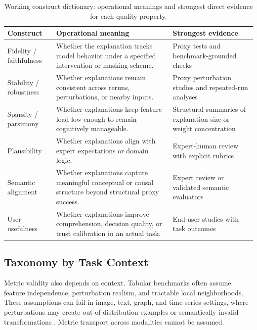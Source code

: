 \documentclass[twoside,11pt]{article}
\begin{document}
\begin{table}[t]
\centering
\caption{Working construct dictionary: operational meanings and strongest
direct evidence for each quality property.}
\begin{tabularx}{\linewidth}{l X X}
\toprule
\textbf{Construct} & \textbf{Operational meaning} & \textbf{Strongest evidence} \\
\midrule
Fidelity / faithfulness & Whether the explanation tracks model behavior under a specified intervention or masking scheme. & Proxy tests and benchmark-grounded checks \\
Stability / robustness & Whether explanations remain consistent across reruns, perturbations, or nearby inputs. & Proxy perturbation studies and repeated-run analyses \\
Sparsity / parsimony & Whether explanations keep feature load low enough to remain cognitively manageable. & Structural summaries of explanation size or weight concentration \\
Plausibility & Whether explanations align with expert expectations or domain logic. & Expert-human review with explicit rubrics \\
Semantic alignment & Whether explanations capture meaningful conceptual or causal structure beyond structural proxy success. & Expert review or validated semantic evaluators \\
User usefulness & Whether explanations improve comprehension, decision quality, or trust calibration in an actual task. & End-user studies with task outcomes \\
\bottomrule
\end{tabularx}
\label{tab:constructs}
\end{table}

\subsection{Taxonomy by Task Context}

Metric validity also depends on context. Tabular benchmarks often assume
feature independence, perturbation realism, and tractable local
neighborhoods. These assumptions can fail in image, text, graph, and
time-series settings, where perturbations may create out-of-distribution
examples or semantically invalid transformations
\citep{agarwal2023gnn_eval,proszewska2025bxaic}. Metric transport across
modalities cannot be assumed.
\end{document}
